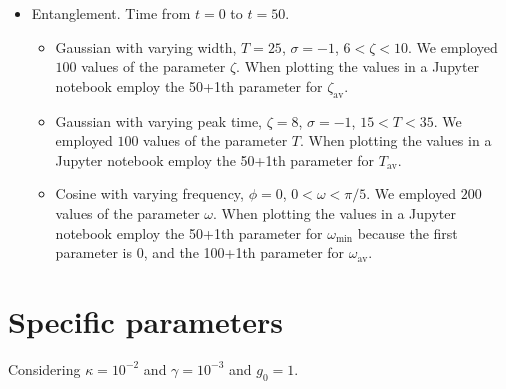 \documentclass{article}
\begin{document}
\begin{itemize}
\begin{itemize}
        When plotting the values in a Jupyter notebook employ the 50+1th parameter for $\zeta_{\text{av}}$.
        \item Gaussian with varying peak time, $\zeta=8$, $\sigma=-1$, $15<T<35$. We employed $100$ values of the parameter $T$.
        When plotting the values in a Jupyter notebook employ the 50+1th parameter for $T_{\text{av}}$.
        \item Cosine with varying frequency, $\phi=0$, $0<\omega<\pi/5$. We employed $200$ values of the parameter $\omega$.
        When plotting the values in a Jupyter notebook employ the 50+1th parameter for $\omega_{\text{min}}$ because the first parameter is $0$, and the 100+1th parameter for $\omega_{\text{av}}$.
    \end{itemize}
    \item Entanglement. Time from $t=0$ to $t=50$.
    \begin{itemize}
        \item Gaussian with varying width, $T=25$, $\sigma=-1$, $6<\zeta<10$. We employed $100$ values of the parameter $\zeta$.
        When plotting the values in a Jupyter notebook employ the 50+1th parameter for $\zeta_{\text{av}}$.
        \item Gaussian with varying peak time, $\zeta=8$, $\sigma=-1$, $15<T<35$. We employed $100$ values of the parameter $T$.
        When plotting the values in a Jupyter notebook employ the 50+1th parameter for $T_{\text{av}}$.
        \item Cosine with varying frequency, $\phi=0$, $0<\omega<\pi/5$. We employed $200$ values of the parameter $\omega$.
        When plotting the values in a Jupyter notebook employ the 50+1th parameter for $\omega_{\text{min}}$ because the first parameter is $0$, and the 100+1th parameter for $\omega_{\text{av}}$.
    \end{itemize}
\end{itemize}

\section{Specific parameters}

Considering $\kappa=10^{-2}$ and $\gamma=10^{-3}$ and $g_0=1$.
\end{document}
